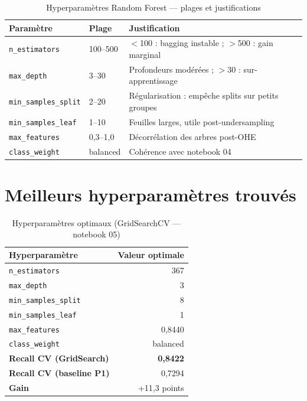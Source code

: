 \documentclass[11pt,a4paper,twoside,openright]{report}
\begin{document}
\begin{table}[H]
  \centering
  \caption{Hyperparamètres Random Forest — plages et justifications}
  \label{tab:hyper}
  \begin{tabularx}{\textwidth}{llX}
    \toprule
    \textbf{Paramètre} & \textbf{Plage} & \textbf{Justification} \\
    \midrule
    \texttt{n\_estimators}      & 100–500 & $<$100 : bagging instable ; $>$500 : gain marginal \\
    \texttt{max\_depth}         & 3–30    & Profondeurs modérées ; $>$30 : sur-apprentissage \\
    \texttt{min\_samples\_split}& 2–20   & Régularisation : empêche splits sur petits groupes \\
    \texttt{min\_samples\_leaf} & 1–10    & Feuilles larges, utile post-undersampling \\
    \texttt{max\_features}      & 0,3–1,0 & Décorrélation des arbres post-OHE \\
    \texttt{class\_weight}      & balanced & Cohérence avec notebook 04 \\
    \bottomrule
  \end{tabularx}
\end{table}

\section{Meilleurs hyperparamètres trouvés}

\begin{table}[H]
  \centering
  \caption{Hyperparamètres optimaux (GridSearchCV — notebook 05)}
  \label{tab:bestparams}
  \begin{tabular}{lr}
    \toprule
    \textbf{Hyperparamètre} & \textbf{Valeur optimale} \\
    \midrule
    \texttt{n\_estimators}       & 367 \\
    \texttt{max\_depth}          & 3 \\
    \texttt{min\_samples\_split} & 8 \\
    \texttt{min\_samples\_leaf}  & 1 \\
    \texttt{max\_features}       & 0,8440 \\
    \texttt{class\_weight}       & balanced \\
    \midrule
    \textbf{Recall CV (GridSearch)} & \textbf{0,8422} \\
    \textbf{Recall CV (baseline P1)} & 0,7294 \\
    \textbf{Gain} & +11,3 points \\
    \bottomrule
  \end{tabular}
\end{table}
\end{document}
